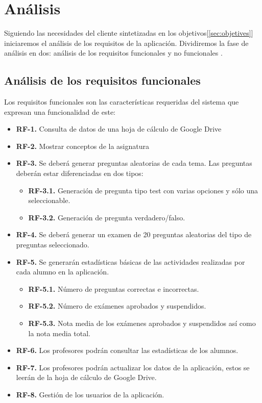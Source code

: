 \chapter{Análisis}

Siguiendo las necesidades del cliente sintetizadas en los objetivos[\ref{sec:objetives}] iniciaremos el análisis de los requisitos de la aplicación. Dividiremos la fase de análisis en dos: análisis de los requisitos funcionales y no funcionales \cite{ing_software}.

\section{Análisis de los requisitos funcionales}

Los requisitos funcionales son las características requeridas del sistema que expresan una funcionalidad de este:


\begin{itemize}
	\item \textbf{RF-1.} Consulta de datos de una hoja de cálculo de Google Drive
	\item \textbf{RF-2.} Mostrar conceptos de la asignatura
	\item \textbf{RF-3.} Se deberá generar preguntas aleatorias de cada tema. Las preguntas deberán estar diferenciadas en dos tipos:
		\begin{itemize}
			\item \textbf{RF-3.1.} Generación de pregunta tipo test con varias opciones y sólo una seleccionable.
			\item \textbf{RF-3.2.} Generación de pregunta verdadero/falso.
		\end{itemize}
	\item \textbf{RF-4.} Se deberá generar un examen de 20 preguntas aleatorias del tipo de preguntas seleccionado.
	\item \textbf{RF-5.} Se generarán estadísticas básicas de las actividades realizadas por cada alumno en la aplicación. 
		\begin{itemize}
			\item \textbf{RF-5.1.} Número de preguntas correctas e incorrectas.
			\item \textbf{RF-5.2.} Número de exámenes aprobados y suspendidos.
			\item \textbf{RF-5.3.} Nota media de los exámenes aprobados y suspendidos así como la nota media total.
		\end{itemize}
	\item \textbf{RF-6.} Los profesores podrán consultar las estadísticas de los alumnos.
	\item \textbf{RF-7.} Los profesores podrán actualizar los datos de la aplicación, estos se leerán de la hoja de cálculo de Google Drive.
	\item \textbf{RF-8.} Gestión de los usuarios de la aplicación.
\end{itemize}


